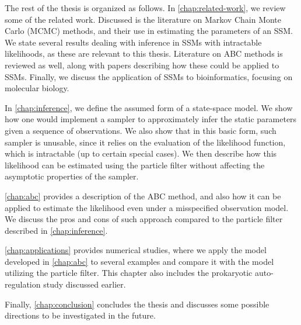 The rest of the thesis is organized as follows. In \autoref{chap:related-work}, we review some of the related work. Discussed is the literature on Markov Chain Monte Carlo (MCMC) methods, and their use in estimating the parameters of an SSM. We state several results dealing with inference in SSMs with intractable likelihoods, as these are relevant to this thesis. Literature on ABC methods is reviewed as well, along with papers describing how these could be applied to SSMs. Finally, we discuss the application of SSMs to bioinformatics, focusing on molecular biology.

In \autoref{chap:inference}, we define the assumed form of a state-space model. We show how one would implement a sampler to approximately infer the static parameters given a sequence of observations. We also show that in this basic form, such sampler is unusable, since it relies on the evaluation of the likelihood function, which is intractable (up to certain special cases). We then describe how this likelihood can be estimated using the particle filter \citep{particle-filter} without affecting the asymptotic properties of the sampler.

\autoref{chap:abc} provides a description of the ABC method, and also how it can be applied to estimate the likelihood even under a misspecified observation model. We discuss the pros and cons of such approach compared to the particle filter described in \autoref{chap:inference}.

\autoref{chap:applications} provides numerical studies, where we apply the model developed in \autoref{chap:abc} to several examples and compare it with the model utilizing the particle filter. This chapter also includes the prokaryotic auto-regulation study discussed earlier.

Finally, \autoref{chap:conclusion} concludes the thesis and discusses some possible directions to be investigated in the future.
